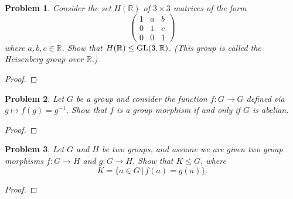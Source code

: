 \documentclass[reqno]{amsart}
\theoremstyle{plain}
\newtheorem{problem}{Problem}
\theoremstyle{definition}
\begin{document}
\begin{problem}
Consider the set $H(\mathbb{R})$ of $3 \times 3$ matrices of the form 
\begin{equation*}
\begin{pmatrix}
1 & a & b \\
0 & 1 & c \\
0 & 0 & 1
\end{pmatrix}
\end{equation*}
where $a,b,c \in \mathbb{R}$.  Show that $H(\mathbb{R}) \le {\rm GL(3,\mathbb{R})}$.  (This group is called the Heisenberg group over $\mathbb{R}$.)
\end{problem}
\begin{proof}

\end{proof}

\begin{problem}
Let $G$ be a group and consider the function $f:G \longrightarrow G$ defined via $g \mapsto f(g) = g^{-1}$.  Show that $f$ is a group morphism if and only if $G$ is abelian.
\end{problem}
\begin{proof}

\end{proof}


\begin{problem}
Let $G$ and $H$ be two groups, and assume we are given two group morphisms $f:G \longrightarrow H$ and $g:G \longrightarrow H$.  Show that $K \le G$, where
$$K = \{ a \in G \, | \, f(a) = g(a) \}. $$
\end{problem}
\begin{proof}

\end{proof}
\end{document}
